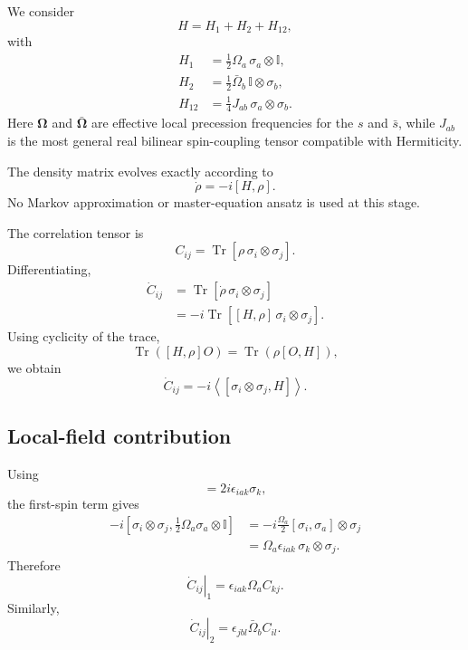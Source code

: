 \documentclass[11pt]{article}
\newcommand{\Id}{\mathbb I}
\newcommand{\Trc}{\operatorname{Tr}}
\newcommand{\eps}{\epsilon}
\begin{document}
We consider
\begin{equation}
H=
H_1+H_2+H_{12},
\end{equation}
with
\begin{align}
H_1&=
\frac12\Omega_a\,\sigma_a\otimes\Id,\\
H_2&=
\frac12\bar\Omega_b\,\Id\otimes\sigma_b,\\
H_{12}
&=
\frac14J_{ab}\,\sigma_a\otimes\sigma_b.
\label{eq:H}
\end{align}
Here $\bm\Omega$ and $\bar{\bm\Omega}$ are effective local precession frequencies for the
$s$ and $\bar s$, while $J_{ab}$ is the most general real bilinear spin-coupling tensor compatible
with Hermiticity.

The density matrix evolves exactly according to
\begin{equation}
\dot\rho=-i[H,\rho].
\label{eq:vonNeumann}
\end{equation}
No Markov approximation or master-equation ansatz is used at this stage.

The correlation tensor is
\begin{equation}
C_{ij}
=
\Trc\left[
\rho\,
\sigma_i\otimes\sigma_j
\right].
\end{equation}
Differentiating,
\begin{align}
\dot C_{ij}
&=
\Trc\left[
\dot\rho\,
\sigma_i\otimes\sigma_j
\right]\\
&=
-i\Trc\left[
[H,\rho]\,
\sigma_i\otimes\sigma_j
\right].
\end{align}
Using cyclicity of the trace,
\begin{equation}
\Trc([H,\rho]O)
=
\Trc(\rho[O,H]),
\end{equation}
we obtain
\begin{equation}
\dot C_{ij}
=
-i\left\langle
[\sigma_i\otimes\sigma_j,H]
\right\rangle.
\label{eq:Ccomm}
\end{equation}

\subsection{Local-field contribution}

Using
\begin{equation}
[\sigma_i,\sigma_a]=2i\eps_{iak}\sigma_k,
\end{equation}
the first-spin term gives
\begin{align}
-i\left[
\sigma_i\otimes\sigma_j,
\frac12\Omega_a\sigma_a\otimes\Id
\right]
&=
-i\frac{\Omega_a}{2}
[\sigma_i,\sigma_a]\otimes\sigma_j\\
&=
\Omega_a\eps_{iak}\,
\sigma_k\otimes\sigma_j.
\end{align}
Therefore
\begin{equation}
\left.\dot C_{ij}\right|_{1}
=
\eps_{iak}\Omega_a C_{kj}.
\end{equation}
Similarly,
\begin{equation}
\left.\dot C_{ij}\right|_{2}
=
\eps_{jbl}\bar\Omega_b C_{il}.
\end{equation}
\end{document}
